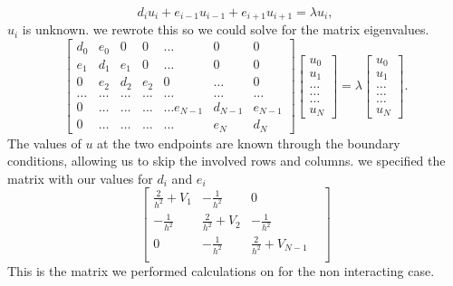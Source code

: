 \documentclass[%
reprint,
superscriptaddress,
showpacs,
nofootinbib,
bibnotes,amsmath,amssymb,aps,
prc, 
]{revtex4-1}
\begin{document}
\begin{equation*}
d_iu_i+e_{i-1}u_{i-1}+e_{i+1}u_{i+1}  = \lambda u_i,
\end{equation*}
$u_i$ is unknown. we rewrote this so we could solve for the matrix eigenvalues.
\begin{equation*}
\begin{bmatrix}d_0 & e_0 & 0   & 0    & \dots  &0     & 0 \\
e_1 & d_1 & e_1 & 0    & \dots  &0     &0 \\
0   & e_2 & d_2 & e_2  &0       &\dots & 0\\
\dots  & \dots & \dots & \dots  &\dots      &\dots & \dots\\
0   & \dots & \dots & \dots  &\dots  e_{N-1}     &d_{N-1} & e_{N-1}\\
0   & \dots & \dots & \dots  &\dots       &e_{N} & d_{N}
\end{bmatrix}  \begin{bmatrix} u_{0} \\
u_{1} \\
\dots\\ \dots\\ \dots\\
u_{N}
\end{bmatrix}=\lambda \begin{bmatrix} u_{0} \\
u_{1} \\
\dots\\ \dots\\ \dots\\
u_{N}
\end{bmatrix}.  
\label{eq:sematrix}
\end{equation*}
The values of $u$ at the two endpoints are known through the boundary conditions, allowing us to skip the involved rows and columns. we specified the matrix with our values for $d_i$ and $e_i$
\begin{equation*}
\begin{bmatrix} \frac{2}{h^2}+V_1 & -\frac{1}{h^2} & 0        \\
-\frac{1}{h^2} & \frac{2}{h^2}+V_2 & -\frac{1}{h^2}     \\
0   & -\frac{1}{h^2} & \frac{2}{h^2}+V_{N-1} &     \\

\end{bmatrix}
\label{eq:matrixse} 
\end{equation*}
This is the matrix we performed calculations on for the non interacting case.
\end{document}
